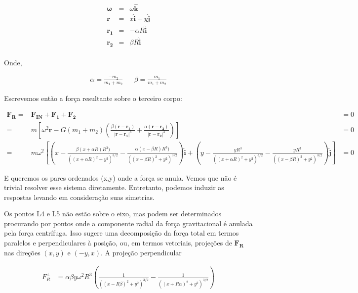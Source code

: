 \begin{eqnarray}
\boldsymbol{\omega} & = & \omega\mathbf{\hat{k}} \\
\mathbf{r} \; & = & x\mathbf{\hat{i}} + y\mathbf{\hat{j}} \\
\mathbf{r_1} & = & -\alpha R\mathbf{\hat{i}} \\
\mathbf{r_2} & = & \beta R\mathbf{\hat{i}} \\
\end{eqnarray}

Onde,

\begin{align}
\alpha = \frac{-m_2}{m_1+m_2} && \beta = \frac{m_1}{m_1+m_2}
\end{align}

Escrevemos então a força resultante sobre o terceiro corpo:

\begin{eqnarray}
\mathbf{F_R} = & \mathbf{F_{IN}} + \mathbf{F_1} + \mathbf{F_2} & = 0 \\
= & m\left[\omega^2\mathbf{r} -G(m_1+m_2)\left(\frac{\beta(\mathbf{r}-\mathbf{r_1})}{|\mathbf{r}-\mathbf{r_1}|^3} + \frac{\alpha(\mathbf{r}-\mathbf{r_2})}{|\mathbf{r}-\mathbf{r_2}|^3}\right) \right] & = 0 \\
= & m\omega^2 \left[\left(x - \frac{\beta(x+\alpha R) R^3)}{((x+\alpha R)^2 + y^2)^{3/2}} - \frac{\alpha(x-\beta R) R^3)}{((x-\beta R)^2 + y^2)^{3/2}}\right)\mathbf{\hat{i}} + \left(y - \frac{y R^3}{((x+\alpha R)^2 + y^2)^{3/2}} - \frac{y R^3}{((x-\beta R)^2 + y^2)^{3/2}}\right)\mathbf{\hat{j}}\right] & =0
\end{eqnarray}

E queremos os pares ordenados (x,y) onde a força se anula. Vemos que não é trivial resolver esse sistema diretamente. Entretanto, podemos induzir as respostas levando em consideração suas simetrias.

Os pontos L4 e L5 não estão sobre o eixo, mas podem ser determinados procurando por pontos onde a componente radial da força gravitacional é anulada pela força centrífuga. Isso sugere uma decomposição da força total em termos paralelos e perpendiculares à posição, ou, em termos vetoriais, projeções de $\mathbf{F_R}$ nas direções $(x, y)$ e $(-y, x)$. A projeção perpendicular

\begin{align}
    F_R^\perp &= \alpha\beta y \omega^2R^3\left( \frac{1}{((x-R\beta)^2+y^2)^{3/2}} - \frac{1}{((x + R\alpha)^2+y^2)^{3/2}} \right)
\end{align}

